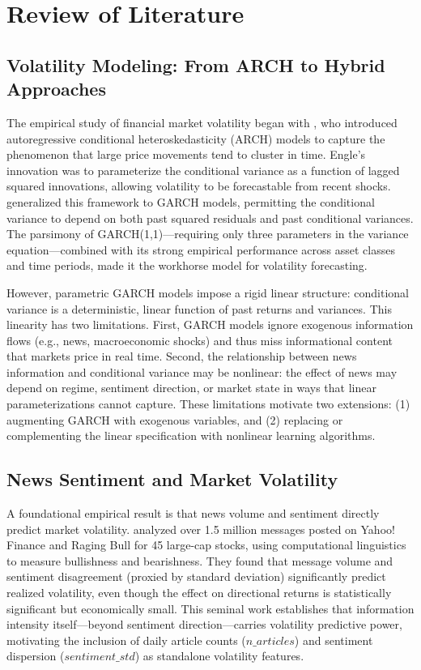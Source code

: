 \section{Review of Literature}

\subsection{Volatility Modeling: From ARCH to Hybrid Approaches}

The empirical study of financial market volatility began with \citet{engle1982autoregressive}, who introduced autoregressive conditional heteroskedasticity (ARCH) models to capture the phenomenon that large price movements tend to cluster in time. Engle's innovation was to parameterize the conditional variance as a function of lagged squared innovations, allowing volatility to be forecastable from recent shocks. \citet{bollerslev1986generalized} generalized this framework to GARCH models, permitting the conditional variance to depend on both past squared residuals and past conditional variances. The parsimony of GARCH(1,1)—requiring only three parameters in the variance equation—combined with its strong empirical performance across asset classes and time periods, made it the workhorse model for volatility forecasting.

However, parametric GARCH models impose a rigid linear structure: conditional variance is a deterministic, linear function of past returns and variances. This linearity has two limitations. First, GARCH models ignore exogenous information flows (e.g., news, macroeconomic shocks) and thus miss informational content that markets price in real time. Second, the relationship between news information and conditional variance may be nonlinear: the effect of news may depend on regime, sentiment direction, or market state in ways that linear parameterizations cannot capture. These limitations motivate two extensions: (1) augmenting GARCH with exogenous variables, and (2) replacing or complementing the linear specification with nonlinear learning algorithms.

\subsection{News Sentiment and Market Volatility}

A foundational empirical result is that news volume and sentiment directly predict market volatility. \citet{antweiler2004all} analyzed over 1.5 million messages posted on Yahoo! Finance and Raging Bull for 45 large-cap stocks, using computational linguistics to measure bullishness and bearishness. They found that message volume and sentiment disagreement (proxied by standard deviation) significantly predict realized volatility, even though the effect on directional returns is statistically significant but economically small. This seminal work establishes that information intensity itself—beyond sentiment direction—carries volatility predictive power, motivating the inclusion of daily article counts ($n\_articles$) and sentiment dispersion ($sentiment\_std$) as standalone volatility features.

